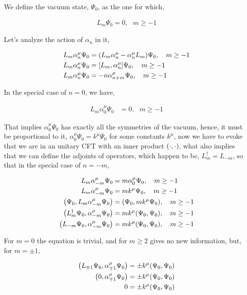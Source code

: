 \problem{}
\probitem{}

We define the vacuum state, $\Psi_0$, as the one for which,

\begin{align*}
    L_m\Psi_0=0,\ \ \ m\geq -1
\end{align*}

Let's analyze the action of $\alpha_n$ in it,

\begin{align*}
    L_m\alpha_n^\mu\Psi_0&=\qty(L_m\alpha_n^\mu-\alpha^\mu_n L_m)\Psi_0,\ \ \ m\geq -1\\
    L_m\alpha_n^\mu\Psi_0&=\comm{L_m}{\alpha_n^\mu}\Psi_0,\ \ \ m\geq -1\\
    L_m\alpha_n^\mu\Psi_0&=-n\alpha_{n+m}^\mu\Psi_0,\ \ \ m\geq -1
\end{align*}

In the special case of $n=0$, we have,

\begin{align*}
    L_m\alpha_0^\mu\Psi_0&=0,\ \ \ m\geq -1
\end{align*}

That implies $\alpha_0^\mu\Psi_0$ has exactly all the symmetries of the vacuum, hence, it must be proportional to it, $\alpha_0^\mu\Psi_0=k^\mu\Psi_0$ for some constants $k^\mu$, now we have to 
evoke that we are in an unitary CFT with an inner product $\qty(\cdot,\cdot)$, what also implies that we can define the adjoints of operators, which happen to be, $L_m^\dagger=L_{-m}$, so that in the special case of 
$n=-m$,

\begin{align*}
    L_m\alpha_{-m}^\mu\Psi_0&=m\alpha_{0}^\mu\Psi_0,\ \ \ m\geq -1\\
    L_m\alpha_{-m}^\mu\Psi_0&=mk^\mu\Psi_0,\ \ \ m\geq -1\\
    \qty(\Psi_0,L_m\alpha_{-m}^\mu\Psi_0)&=\qty(\Psi_0,mk^\mu\Psi_0),\ \ \ m\geq -1\\
    \qty(L_m^\dagger\Psi_0,\alpha_{-m}^\mu\Psi_0)&=mk^\mu\qty(\Psi_0,\Psi_0),\ \ \ m\geq -1\\
    \qty(L_{-m}\Psi_0,\alpha_{-m}^\mu\Psi_0)&=mk^\mu\qty(\Psi_0,\Psi_0),\ \ \ m\geq -1
\end{align*}

For $m=0$ the equation is trivial, and for $m\geq 2$ gives no new information, but, for $m=\pm 1$,

\begin{align*}
    \qty(L_{\mp1}\Psi_0,\alpha_{\mp1}^\mu\Psi_0)&=\pm k^\mu\qty(\Psi_0,\Psi_0)\\
    \qty(0,\alpha_{\mp1}^\mu\Psi_0)&=\pm k^\mu\qty(\Psi_0,\Psi_0)\\
    0&=\pm k^\mu\qty(\Psi_0,\Psi_0)
\end{align*}

